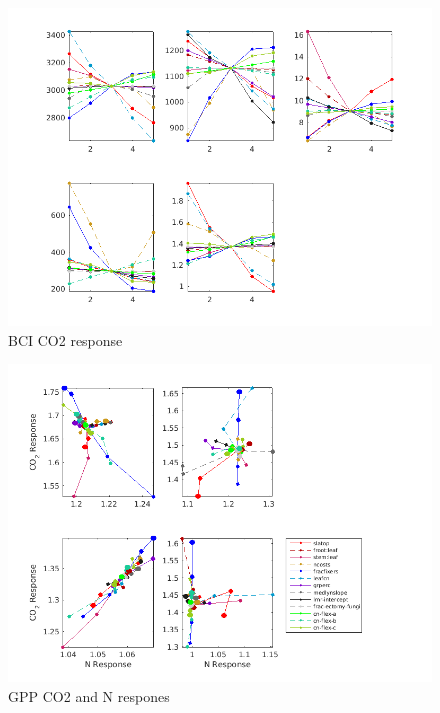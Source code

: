 \documentclass[draft,linenumbers]{agujournal}
\begin{document}
  
 \begin{figure}[h]
     \centering
     \includegraphics[width=1.3\textwidth, left]{matlab/figures/frac_deviation_CO2_response_1CLM5_BCI__y1.png}
     \caption{BCI CO2 response}
     \label{BCI CO2 response Parameter Sensitivity}
  \end{figure}
  
      
 \begin{figure}[h]
     \centering
     \includegraphics[width=1.55\textwidth, left]{matlab/figures/OCT_CNdep_GPP1_CLM50defpft_ndep_1x1pt_US-Me2_ens_MIC_p2001.png}
     \caption{GPP CO2 and N respones}
     \label{GPP CO2 and N respones 2001}
  \end{figure}
\end{document}
